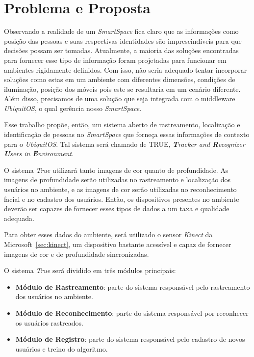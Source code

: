 \chapter{Problema e Proposta}

Observando a realidade de um \textit{SmartSpace} fica claro que as informações como posição das pessoas e suas respectivas identidades são imprescindíveis para que decisões possam ser tomadas. Atualmente, a maioria das soluções encontradas para fornecer esse tipo de informação foram projetadas para funcionar em ambientes rigidamente definidos. Com isso, não seria adequado tentar incorporar soluções como estas em um ambiente com diferentes dimensões, condições de iluminação, posição dos móveis pois este se resultaria em um cenário diferente. Além disso, precisamos de uma solução que seja integrada com o middleware \textit{UbiquitOS}, o qual gerência nosso \textit{SmartSpace}.

Esse trabalho propõe, então, um sistema aberto de rastreamento, localização e identificação de pessoas no \textit{SmartSpace} que forneça essas informações de contexto para o \textit{UbiquitOS}. Tal sistema será chamado de TRUE, \textit{\textbf{T}racker and \textbf{R}ecognizer \textbf{U}sers in \textbf{E}nvironment}.

O sistema \textit{True} utilizará tanto imagens de cor quanto de profundidade. As imagens de profundidade serão utilizadas no rastreamento e localização dos usuários no ambiente, e as imagens de cor serão utilizadas no reconhecimento facial e no cadastro dos usuários. Então, os dispositivos presentes no ambiente deverão ser capazes de fornecer esses tipos de dados a um taxa e qualidade adequada. 

Para obter esses dados do ambiente, será utilizado o sensor \textit{Kinect} da Microsoft~\ref{sec:kinect}, um dispositivo bastante acessível e capaz de fornecer imagens de cor e de profundidade sincronizadas.

O sistema \textit{True} será dividido em três módulos principais:

	\begin{itemize}
		\item \textbf{Módulo de Rastreamento}: parte do sistema responsável pelo rastreamento dos usuários no ambiente.
		\item \textbf{Módulo de Reconhecimento}: parte do sistema responsável por reconhecer os usuários rastreados.
		\item \textbf{Módulo de Registro}: parte do sistema responsável pelo cadastro de novos usuários e treino do algoritmo.
	\end{itemize}

